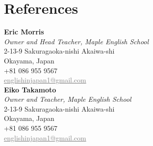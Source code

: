 \documentclass[10pt,a4paper,sans]{moderncv} %
\newcommand{\vs}[0]{\smallskip}
\begin{document}
\makecvtitle %
\par
\vspace{-4ex}


\section{References}


\vs
\textbf{Eric Morris}\\
\textit{Owner and Head Teacher, Maple English School}\\
2-13-9 Sakuragaoka-nishi Akaiwa-shi\\
Okayama, Japan\\
+81 086 955 9567\\
\textcolor{gray}{\underline{englishinjapan1@gmail.com}}\\

\textbf{Eiko Takamoto}\\
\textit{Owner and Teacher, Maple English School}\\
2-13-9 Sakuragaoka-nishi Akaiwa-shi\\
Okayama, Japan\\
+81 086 955 9567\\
\textcolor{gray}{\underline{englishinjapan1@gmail.com}}\\


\end{document}
